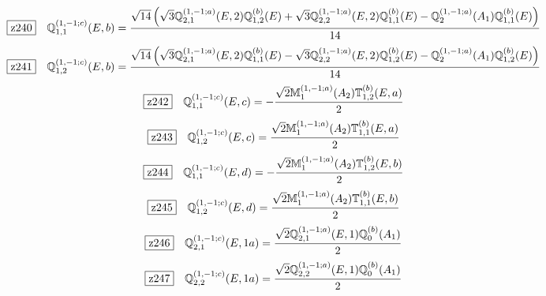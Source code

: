 \documentclass[fleqn,10pt,landscape]{jsarticle}
\begin{document}
\begin{dmath*}
\hspace*{3mm}\fbox{z240}\quad \mathbb{Q}_{1,1}^{(1,-1;c)}(E,b)=\frac{\sqrt{14} \left(\sqrt{3} \mathbb{Q}_{2,1}^{(1,-1;a)}(E,2) \mathbb{Q}_{1,2}^{(b)}(E) + \sqrt{3} \mathbb{Q}_{2,2}^{(1,-1;a)}(E,2) \mathbb{Q}_{1,1}^{(b)}(E) - \mathbb{Q}_{2}^{(1,-1;a)}(A_{1}) \mathbb{Q}_{1,1}^{(b)}(E)\right)}{14}
\end{dmath*}
\begin{dmath*}
\hspace*{3mm}\fbox{z241}\quad \mathbb{Q}_{1,2}^{(1,-1;c)}(E,b)=\frac{\sqrt{14} \left(\sqrt{3} \mathbb{Q}_{2,1}^{(1,-1;a)}(E,2) \mathbb{Q}_{1,1}^{(b)}(E) - \sqrt{3} \mathbb{Q}_{2,2}^{(1,-1;a)}(E,2) \mathbb{Q}_{1,2}^{(b)}(E) - \mathbb{Q}_{2}^{(1,-1;a)}(A_{1}) \mathbb{Q}_{1,2}^{(b)}(E)\right)}{14}
\end{dmath*}
\begin{dmath*}
\hspace*{3mm}\fbox{z242}\quad \mathbb{Q}_{1,1}^{(1,-1;c)}(E,c)=- \frac{\sqrt{2} \mathbb{M}_{1}^{(1,-1;a)}(A_{2}) \mathbb{T}_{1,2}^{(b)}(E,a)}{2}
\end{dmath*}
\begin{dmath*}
\hspace*{3mm}\fbox{z243}\quad \mathbb{Q}_{1,2}^{(1,-1;c)}(E,c)=\frac{\sqrt{2} \mathbb{M}_{1}^{(1,-1;a)}(A_{2}) \mathbb{T}_{1,1}^{(b)}(E,a)}{2}
\end{dmath*}
\begin{dmath*}
\hspace*{3mm}\fbox{z244}\quad \mathbb{Q}_{1,1}^{(1,-1;c)}(E,d)=- \frac{\sqrt{2} \mathbb{M}_{1}^{(1,-1;a)}(A_{2}) \mathbb{T}_{1,2}^{(b)}(E,b)}{2}
\end{dmath*}
\begin{dmath*}
\hspace*{3mm}\fbox{z245}\quad \mathbb{Q}_{1,2}^{(1,-1;c)}(E,d)=\frac{\sqrt{2} \mathbb{M}_{1}^{(1,-1;a)}(A_{2}) \mathbb{T}_{1,1}^{(b)}(E,b)}{2}
\end{dmath*}
\begin{dmath*}
\hspace*{3mm}\fbox{z246}\quad \mathbb{Q}_{2,1}^{(1,-1;c)}(E,1a)=\frac{\sqrt{2} \mathbb{Q}_{2,1}^{(1,-1;a)}(E,1) \mathbb{Q}_{0}^{(b)}(A_{1})}{2}
\end{dmath*}
\begin{dmath*}
\hspace*{3mm}\fbox{z247}\quad \mathbb{Q}_{2,2}^{(1,-1;c)}(E,1a)=\frac{\sqrt{2} \mathbb{Q}_{2,2}^{(1,-1;a)}(E,1) \mathbb{Q}_{0}^{(b)}(A_{1})}{2}
\end{dmath*}
\end{document}
